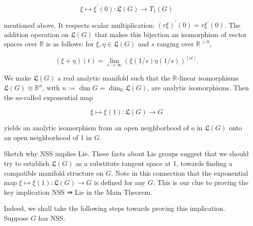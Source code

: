 \documentclass[10pt]{article}
\begin{document}
$$
\xi \mapsto \xi^{\prime}(0): \mathfrak{L}(G) \rightarrow T_{1}(G)
$$

mentioned above. It respects scalar multiplication: $(r \xi)^{\prime}(0)=r \xi^{\prime}(0)$. The addition operation on $\mathfrak{L}(G)$ that makes this bijection an isomorphism of vector spaces over $\mathbb{R}$ is as follows: for $\xi, \eta \in \mathfrak{L}(G)$ and $s$ ranging over $\mathbb{R}^{>0}$,

$$
(\xi+\eta)(t)=\lim _{s \rightarrow \infty}(\xi(1 / s) \eta(1 / s))^{[s t]} .
$$

We make $\mathfrak{L}(G)$ a real analytic manifold such that the $\mathbb{R}$-linear isomorphisms $\mathfrak{L}(G) \cong \mathbb{R}^{n}$, with $n:=\operatorname{dim} G=\operatorname{dim}_{\mathbb{R}} \mathfrak{L}(G)$, are analytic isomorphisms. Then the so-called exponential map

$$
\xi \mapsto \xi(1): \mathfrak{L}(G) \rightarrow G
$$

yields an analytic isomorphism from an open neighborhood of $o$ in $\mathfrak{L}(G)$ onto an open neighborhood of 1 in $G$.

Sketch why NSS implies Lie. These facts about Lie groups suggest that we should try to establish $\mathfrak{L}(G)$ as a substitute tangent space at 1, towards finding a compatible manifold structure on $G$. Note in this connection that the exponential map $\xi \mapsto \xi(1): \mathfrak{L}(G) \rightarrow G$ is defined for any $G$. This is our clue to proving the key implication NSS ⇒ Lie in the Main Theorem.

Indeed, we shall take the following steps towards proving this implication. Suppose $G$ has NSS.
\end{document}
